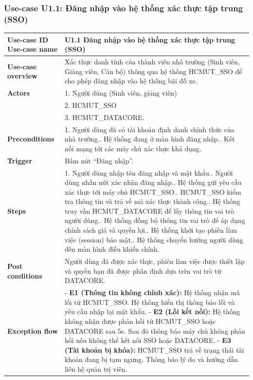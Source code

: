 \subsubsection{Use-case U1.1: Đăng nhập vào hệ thống xác thực tập trung (SSO)}
\noindent
\begin{tabularx}{\textwidth}{|>{\raggedright\arraybackslash}p{4cm}|X|}
\hline
\textbf{Use-case ID} \newline \textbf{Use-case name} & U1.1 \newline \textbf{Đăng nhập vào hệ thống xác thực tập trung (SSO)} \\ \hline
\textbf{Use-case overview} & Xác thực danh tính của thành viên nhà trường (Sinh viên, Giảng viên, Cán bộ) thông qua hệ thống HCMUT\_SSO để cho phép đăng nhập vào hệ thống bãi đỗ xe. \\ \hline
\textbf{Actors} & 1. Người dùng (Sinh viên, giảng viên) \\ 
& 2. HCMUT\_SSO \\ 
& 3. HCMUT\_DATACORE. \\ \hline
\textbf{Preconditions} & 
1. Người dùng đã có tài khoản định danh chính thức của nhà trường.\newline
2. Hệ thống đang ở màn hình đăng nhập.\newline
3. Kết nối mạng tới các máy chủ xác thực khả dụng. \\ \hline
\textbf{Trigger} & Bấm nút “Đăng nhập”. \\ \hline
\textbf{Steps} & 
1. Người dùng nhập tên đăng nhập và mật khẩu.\newline
2. Người dùng nhấn nút xác nhận đăng nhập.\newline
3. Hệ thống gửi yêu cầu xác thực tới máy chủ HCMUT\_SSO.\newline
4. HCMUT\_SSO kiểm tra thông tin và trả về mã xác thực thành công.\newline
5. Hệ thống truy vấn HCMUT\_DATACORE để lấy thông tin vai trò người dùng.\newline
6. Hệ thống đồng bộ thông tin vai trò để áp dụng chính sách giá và quyền lợi.\newline
7. Hệ thống khởi tạo phiên làm việc (session) bảo mật.\newline
8. Hệ thống chuyển hướng người dùng đến màn hình điều khiển chính. \\ \hline
\textbf{Post conditions} & Người dùng đã được xác thực, phiên làm việc được thiết lập và quyền hạn đã được phân định dựa trên vai trò từ DATACORE. \\ \hline
\textbf{Exception flow} & 
- \textbf{E1 (Thông tin không chính xác):} Hệ thống nhận mã lỗi từ HCMUT\_SSO. Hệ thống hiển thị thông báo lỗi và yêu cầu nhập lại mật khẩu. \newline 
- \textbf{E2 (Lỗi kết nối):} Hệ thống không nhận được phản hồi từ HCMUT\_SSO hoặc DATACORE sau 5s. Sau đó thông báo máy chủ không phản hồi nếu không thể kết nối SSO hoặc DATACORE.\newline
- \textbf{E3 (Tài khoản bị khóa):} HCMUT\_SSO trả về trạng thái tài khoản đang bị tạm ngưng. Thông báo lý do và hướng dẫn liên hệ quản trị viên. \\ \hline
\end{tabularx}

